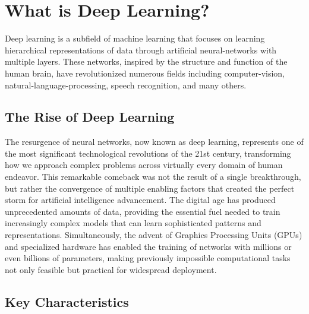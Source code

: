 
\section{What is Deep Learning? }
\label{sec:what-is-dl}

Deep learning is a subfield of machine learning that focuses on learning hierarchical representations of data through artificial \gls{neural-network}s with multiple layers. These networks, inspired by the structure and function of the human brain, have revolutionized numerous fields including \gls{computer-vision}, \gls{natural-language-processing}, speech recognition, and many others.

\subsection{The Rise of Deep Learning}

The resurgence of neural networks, now known as deep learning, represents one of the most significant technological revolutions of the 21st century, transforming how we approach complex problems across virtually every domain of human endeavor. This remarkable comeback was not the result of a single breakthrough, but rather the convergence of multiple enabling factors that created the perfect storm for artificial intelligence advancement. The digital age has produced unprecedented amounts of data, providing the essential fuel needed to train increasingly complex models that can learn sophisticated patterns and representations. Simultaneously, the advent of Graphics Processing Units (GPUs) and specialized hardware has enabled the training of networks with millions or even billions of parameters, making previously impossible computational tasks not only feasible but practical for widespread deployment.

\subsection{Key Characteristics}

